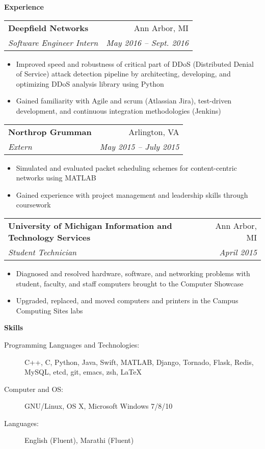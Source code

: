 \documentclass[letterpaper,11pt]{article}
\makeatletter
\newcommand{\resitem}[1]{\item #1 \vspace{-2pt}}
\newcommand{\resheading}[1]{{\large \colorbox{mygrey}{\begin{minipage}{\textwidth}{\textbf{#1 \vphantom{p\^{E}}}}\end{minipage}}}}
\newcommand{\ressubheading}[4]{
\begin{tabular*}{6.875in}{l@{\extracolsep{\fill}}r}
		\textbf{#1} & #2 \\
		\textit{#3} & \textit{#4} \\
\end{tabular*}\vspace{-6pt}}
\renewcommand{\footnotesize}{\fontsize{10pt}{11pt}\selectfont}
\makeatother
\begin{document}
		\resheading{Experience}
		\begin{description}
			\item 
			\ressubheading{Deepfield Networks}{Ann Arbor, MI}
			{Software Engineer Intern}{May 2016 -- Sept. 2016}
			{	
				\footnotesize
				\begin{itemize}
					\resitem{Improved speed and robustness of critical part of DDoS (Distributed Denial of Service) attack detection pipeline by architecting, developing, and optimizing DDoS analysis library using Python}
					\resitem{Gained familiarity with Agile and scrum (Atlassian Jira), test-driven development, and continuous integration methodologies (Jenkins)}
				\end{itemize}
			}
			\item 
			\ressubheading{Northrop Grumman}{Arlington, VA}
			{Extern}{May 2015 -- July 2015}
			{	
				\footnotesize
				\begin{itemize}
					\resitem{Simulated and evaluated packet scheduling schemes for content-centric networks using MATLAB}
					\resitem{Gained experience with project management and leadership skills through coursework}
				\end{itemize}
			}
			\item 
			\ressubheading{University of Michigan Information and Technology Services}{Ann Arbor, MI}
			{Student Technician}{April 2015}
			{	
				\footnotesize
				\begin{itemize}
					\resitem{Diagnosed and resolved hardware, software, and networking problems with student, faculty, and staff computers brought to the Computer Showcase}
					\resitem{Upgraded, replaced, and moved computers and printers in the Campus Computing Sites labs}
				\end{itemize}
			}
			
		\end{description}  %
		
		\resheading{Skills}
		\begin{description}
			\item[Programming Languages and Technologies:]
				{	
					\footnotesize
					C++, C, Python, Java, Swift, MATLAB, Django, Tornado, Flask, Redis, MySQL, etcd, git, emacs, zsh, \LaTeX
				}
			\item[Computer and OS:]
				{
					\footnotesize
					GNU/Linux, OS X, Microsoft Windows 7/8/10
				}
			\item[Languages:]
				{
					\footnotesize
					English (Fluent), Marathi (Fluent)
				}
		\end{description} %
		
\end{document}
